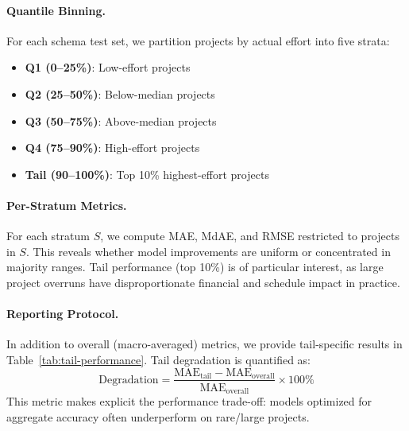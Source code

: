 \documentclass{ieeeaccess}
\begin{document}
\paragraph{Quantile Binning.}
For each schema test set, we partition projects by actual effort into five strata:
\begin{itemize}[leftmargin=1.5em]
    \item \textbf{Q1 (0--25\%)}: Low-effort projects
    \item \textbf{Q2 (25--50\%)}: Below-median projects
    \item \textbf{Q3 (50--75\%)}: Above-median projects
    \item \textbf{Q4 (75--90\%)}: High-effort projects
    \item \textbf{Tail (90--100\%)}: Top 10\% highest-effort projects
\end{itemize}

\paragraph{Per-Stratum Metrics.}
For each stratum $S$, we compute MAE, MdAE, and RMSE restricted to projects in $S$. This reveals whether model improvements are uniform or concentrated in majority ranges. Tail performance (top 10\%) is of particular interest, as large project overruns have disproportionate financial and schedule impact in practice.

\paragraph{Reporting Protocol.}
In addition to overall (macro-averaged) metrics, we provide tail-specific results in Table~\ref{tab:tail-performance}. Tail degradation is quantified as:
\[
\text{Degradation} = \frac{\text{MAE}_{\text{tail}} - \text{MAE}_{\text{overall}}}{\text{MAE}_{\text{overall}}} \times 100\%
\]
This metric makes explicit the performance trade-off: models optimized for aggregate accuracy often underperform on rare/large projects.
\end{document}
